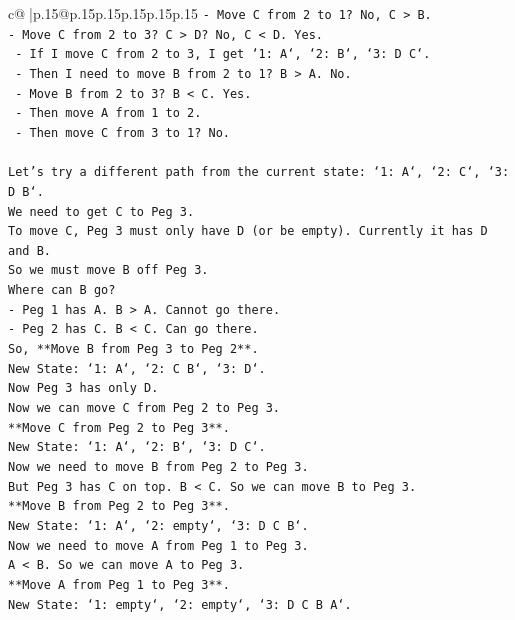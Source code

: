 \documentclass{article}
\begin{document}
{\begin{supertabular}{c@{$\;$}|p{.15\linewidth}@{}p{.15\linewidth}p{.15\linewidth}p{.15\linewidth}p{.15\linewidth}p{.15\linewidth}}
{{{\texttt{{-} Move C from 2 to 1? No, C > B.} \\
\texttt{{-} Move C from 2 to 3? C > D? No, C < D. Yes.} \\
\texttt{  {-} If I move C from 2 to 3, I get `1: A`, `2: B`, `3: D C`.} \\
\texttt{  {-} Then I need to move B from 2 to 1? B > A. No.} \\
\texttt{  {-} Move B from 2 to 3? B < C. Yes.} \\
\texttt{  {-} Then move A from 1 to 2.} \\
\texttt{  {-} Then move C from 3 to 1? No.} \\
\\ 
\texttt{Let's try a different path from the current state: `1: A`, `2: C`, `3: D B`.} \\
\texttt{We need to get C to Peg 3.} \\
\texttt{To move C, Peg 3 must only have D (or be empty). Currently it has D and B.} \\
\texttt{So we must move B off Peg 3.} \\
\texttt{Where can B go?} \\
\texttt{{-} Peg 1 has A. B > A. Cannot go there.} \\
\texttt{{-} Peg 2 has C. B < C. Can go there.} \\
\texttt{So, **Move B from Peg 3 to Peg 2**.} \\
\texttt{New State: `1: A`, `2: C B`, `3: D`.} \\
\texttt{Now Peg 3 has only D.} \\
\texttt{Now we can move C from Peg 2 to Peg 3.} \\
\texttt{**Move C from Peg 2 to Peg 3**.} \\
\texttt{New State: `1: A`, `2: B`, `3: D C`.} \\
\texttt{Now we need to move B from Peg 2 to Peg 3.} \\
\texttt{But Peg 3 has C on top. B < C. So we can move B to Peg 3.} \\
\texttt{**Move B from Peg 2 to Peg 3**.} \\
\texttt{New State: `1: A`, `2: empty`, `3: D C B`.} \\
\texttt{Now we need to move A from Peg 1 to Peg 3.} \\
\texttt{A < B. So we can move A to Peg 3.} \\
\texttt{**Move A from Peg 1 to Peg 3**.} \\
\texttt{New State: `1: empty`, `2: empty`, `3: D C B A`.} \\
}}}
\end{supertabular}}
\end{document}
